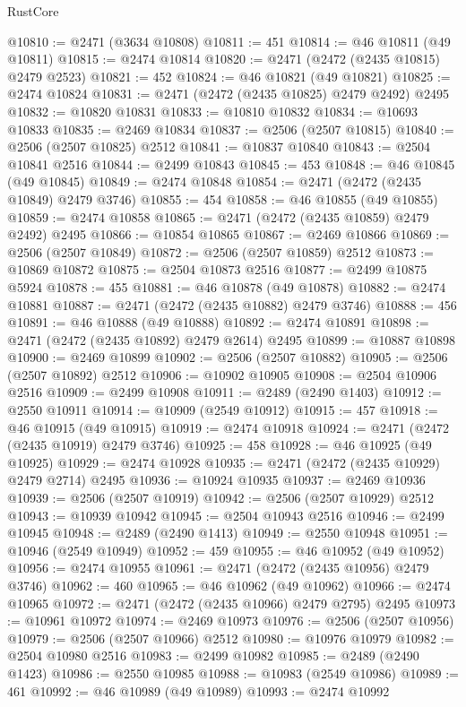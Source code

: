 \begin{lexlean}{RustCore}
\begin{coremodule}
@10810 := @2471 (@3634 @10808)
@10811 := 451
@10814 := @46 @10811 (@49 @10811)
@10815 := @2474 @10814
@10820 := @2471 (@2472 (@2435 @10815) @2479 @2523)
@10821 := 452
@10824 := @46 @10821 (@49 @10821)
@10825 := @2474 @10824
@10831 := @2471 (@2472 (@2435 @10825) @2479 @2492) @2495
@10832 := @10820 @10831
@10833 := @10810 @10832
@10834 := @10693 @10833
@10835 := @2469 @10834
@10837 := @2506 (@2507 @10815)
@10840 := @2506 (@2507 @10825) @2512
@10841 := @10837 @10840
@10843 := @2504 @10841 @2516
@10844 := @2499 @10843
@10845 := 453
@10848 := @46 @10845 (@49 @10845)
@10849 := @2474 @10848
@10854 := @2471 (@2472 (@2435 @10849) @2479 @3746)
@10855 := 454
@10858 := @46 @10855 (@49 @10855)
@10859 := @2474 @10858
@10865 := @2471 (@2472 (@2435 @10859) @2479 @2492) @2495
@10866 := @10854 @10865
@10867 := @2469 @10866
@10869 := @2506 (@2507 @10849)
@10872 := @2506 (@2507 @10859) @2512
@10873 := @10869 @10872
@10875 := @2504 @10873 @2516
@10877 := @2499 @10875 @5924
@10878 := 455
@10881 := @46 @10878 (@49 @10878)
@10882 := @2474 @10881
@10887 := @2471 (@2472 (@2435 @10882) @2479 @3746)
@10888 := 456
@10891 := @46 @10888 (@49 @10888)
@10892 := @2474 @10891
@10898 := @2471 (@2472 (@2435 @10892) @2479 @2614) @2495
@10899 := @10887 @10898
@10900 := @2469 @10899
@10902 := @2506 (@2507 @10882)
@10905 := @2506 (@2507 @10892) @2512
@10906 := @10902 @10905
@10908 := @2504 @10906 @2516
@10909 := @2499 @10908
@10911 := @2489 (@2490 @1403)
@10912 := @2550 @10911
@10914 := @10909 (@2549 @10912)
@10915 := 457
@10918 := @46 @10915 (@49 @10915)
@10919 := @2474 @10918
@10924 := @2471 (@2472 (@2435 @10919) @2479 @3746)
@10925 := 458
@10928 := @46 @10925 (@49 @10925)
@10929 := @2474 @10928
@10935 := @2471 (@2472 (@2435 @10929) @2479 @2714) @2495
@10936 := @10924 @10935
@10937 := @2469 @10936
@10939 := @2506 (@2507 @10919)
@10942 := @2506 (@2507 @10929) @2512
@10943 := @10939 @10942
@10945 := @2504 @10943 @2516
@10946 := @2499 @10945
@10948 := @2489 (@2490 @1413)
@10949 := @2550 @10948
@10951 := @10946 (@2549 @10949)
@10952 := 459
@10955 := @46 @10952 (@49 @10952)
@10956 := @2474 @10955
@10961 := @2471 (@2472 (@2435 @10956) @2479 @3746)
@10962 := 460
@10965 := @46 @10962 (@49 @10962)
@10966 := @2474 @10965
@10972 := @2471 (@2472 (@2435 @10966) @2479 @2795) @2495
@10973 := @10961 @10972
@10974 := @2469 @10973
@10976 := @2506 (@2507 @10956)
@10979 := @2506 (@2507 @10966) @2512
@10980 := @10976 @10979
@10982 := @2504 @10980 @2516
@10983 := @2499 @10982
@10985 := @2489 (@2490 @1423)
@10986 := @2550 @10985
@10988 := @10983 (@2549 @10986)
@10989 := 461
@10992 := @46 @10989 (@49 @10989)
@10993 := @2474 @10992

\end{coremodule}
\end{lexlean}
